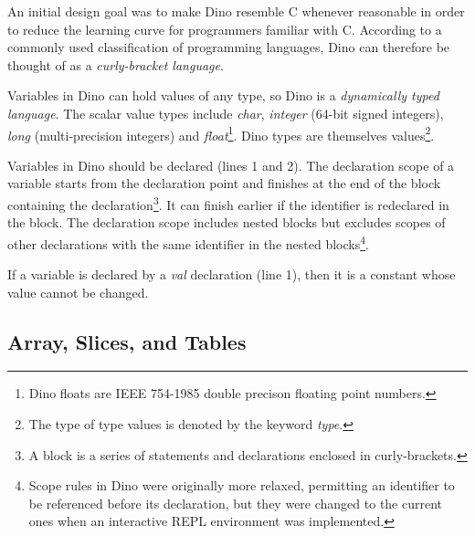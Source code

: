 \documentclass[preprint]{sigplanconf}
\begin{document}
An initial design goal was to make Dino resemble C whenever reasonable
in order to reduce the learning curve for programmers familiar with C.
According to a commonly used classification of programming languages,
Dino can therefore be thought of as a \emph{curly-bracket language}.

Variables in Dino can hold values of any type, so Dino
is a \emph{dynamically typed language}.  The scalar value types include \emph{char},
\emph{integer} (64-bit signed integers),
\emph{long} (multi-precision integers) and
\emph{float}\footnote{Dino floats are IEEE 754-1985 double precison
  floating point numbers.}.
Dino types are themselves values\footnote{The type of type values is denoted by the keyword \emph{type}.}.

Variables in Dino should be declared (lines 1 and 2). 
The declaration
scope of a variable starts from the declaration point and finishes at the end of
the block containing the declaration\footnote{A block is a series of statements and declarations enclosed in curly-brackets.}.
It can finish earlier if the identifier is redeclared in the block.
The declaration scope includes nested blocks but excludes scopes of other
declarations with the same identifier in the nested
blocks\footnote{Scope rules in Dino were originally more relaxed,
permitting an identifier to be referenced before its declaration,
 but
they were changed to the current ones when an interactive REPL environment
was implemented.}.

If a variable is declared by a \emph{val} declaration (line 1), then it is a constant
whose value cannot be changed.  

\subsection{Array, Slices, and Tables}
\end{document}
